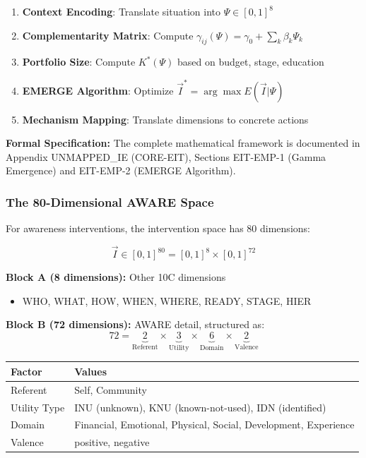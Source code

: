 \begin{enumerate}
    \item \textbf{Context Encoding}: Translate situation into $\Psi \in [0,1]^8$
    \item \textbf{Complementarity Matrix}: Compute $\gamma_{ij}(\Psi) = \gamma_0 + \sum_k \beta_k \Psi_k$
    \item \textbf{Portfolio Size}: Compute $K^*(\Psi)$ based on budget, stage, education
    \item \textbf{EMERGE Algorithm}: Optimize $\vec{I}^* = \arg\max E(\vec{I} | \Psi)$
    \item \textbf{Mechanism Mapping}: Translate dimensions to concrete actions
\end{enumerate}

\begin{cross-reference}
\textbf{Formal Specification:} The complete mathematical framework is documented in Appendix UNMAPPED_IE (CORE-EIT), Sections EIT-EMP-1 (Gamma Emergence) and EIT-EMP-2 (EMERGE Algorithm).
\end{cross-reference}

\subsubsection{The 80-Dimensional AWARE Space}
\label{subsubsec:80d-space}

For awareness interventions, the intervention space has 80 dimensions:

\begin{equation}
\vec{I} \in [0,1]^{80} = [0,1]^{8} \times [0,1]^{72}
\end{equation}

\textbf{Block A (8 dimensions):} Other 10C dimensions
\begin{itemize}[nosep]
    \item WHO, WHAT, HOW, WHEN, WHERE, READY, STAGE, HIER
\end{itemize}

\textbf{Block B (72 dimensions):} AWARE detail, structured as:
\begin{equation}
72 = \underbrace{2}_{\text{Referent}} \times \underbrace{3}_{\text{Utility}} \times \underbrace{6}_{\text{Domain}} \times \underbrace{2}_{\text{Valence}}
\end{equation}

\begin{center}
\small
\begin{tabular}{ll}
\textbf{Factor} & \textbf{Values} \\
\midrule
Referent & Self, Community \\
Utility Type & INU (unknown), KNU (known-not-used), IDN (identified) \\
Domain & Financial, Emotional, Physical, Social, Development, Experience \\
Valence & positive, negative \\
\end{tabular}
\end{center}

